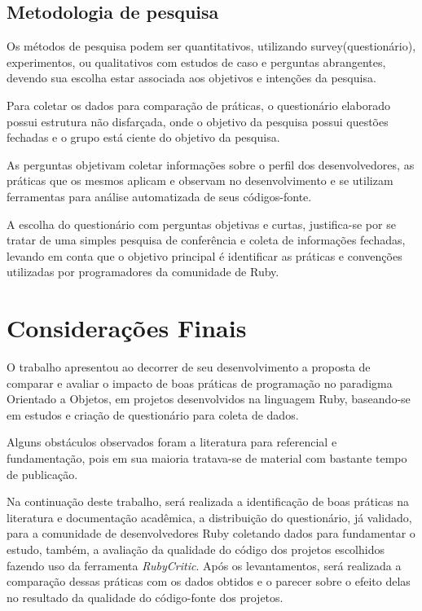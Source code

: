 \documentclass[11pt,a4paper,usenames,dvipsnames]{article}
\begin{document}
\subsection{Metodologia de pesquisa}

Os métodos de pesquisa podem ser quantitativos, utilizando survey(questionário), experimentos, ou qualitativos com estudos de caso e perguntas abrangentes, devendo sua escolha estar associada aos objetivos e intenções da pesquisa\cite{freitas2000metodo}.

Para coletar os dados para comparação de práticas, o questionário elaborado possui estrutura não disfarçada, onde o objetivo da pesquisa possui questões fechadas e o grupo está ciente do objetivo da pesquisa\cite{carnevalli2001desenvolvimento}. 

As perguntas objetivam coletar informações sobre o perfil dos desenvolvedores, as práticas que os mesmos aplicam e observam no desenvolvimento e se utilizam ferramentas para análise automatizada de seus códigos-fonte.

A escolha do questionário com perguntas objetivas e curtas, justifica-se por se tratar de uma simples pesquisa de conferência e coleta de informações fechadas, levando em conta que o objetivo principal é identificar as práticas e convenções utilizadas por programadores da comunidade de Ruby.

\section{Considerações Finais}\label{sec:Conclusions}

O trabalho apresentou ao decorrer de seu desenvolvimento a proposta de comparar e avaliar o impacto de boas práticas de programação no paradigma Orientado a Objetos, em projetos desenvolvidos na linguagem Ruby, baseando-se em estudos e criação de questionário para coleta de dados.

Alguns obstáculos observados foram a literatura para referencial e fundamentação, pois em sua maioria tratava-se de material com bastante tempo de publicação.

Na continuação deste trabalho, será realizada a identificação de boas práticas na literatura e documentação acadêmica, a distribuição do questionário, já validado, para a comunidade de desenvolvedores Ruby coletando dados para fundamentar o estudo, também, a avaliação da qualidade do código dos projetos escolhidos fazendo uso da ferramenta \textit{RubyCritic}. Após os levantamentos, será realizada a comparação dessas práticas com os dados obtidos e o parecer sobre o efeito delas no resultado da qualidade do código-fonte dos projetos.

\renewcommand\refname{Referências}
{\small


}
\end{document}
